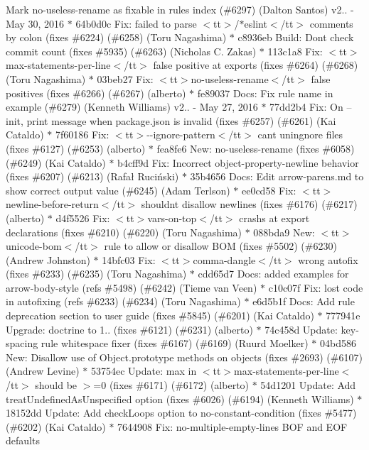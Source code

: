 \begin{DoxyItemize}
Mark no-\/useless-\/rename as fixable in rules index (\#6297) (\+Dalton Santos)  v2.. -\/ May 30, 2016  \texorpdfstring{$\ast$}{*} 64b0d0c Fix\+: failed to parse $<$tt$>$/\texorpdfstring{$\ast$}{*}eslint$<$/tt$>$ comments by colon (fixes \#6224) (\#6258) (\+Toru Nagashima) \texorpdfstring{$\ast$}{*} c8936eb Build\+: Don\textquotesingle{}t check commit count (fixes \#5935) (\#6263) (\+Nicholas C. Zakas) \texorpdfstring{$\ast$}{*} 113c1a8 Fix\+: $<$tt$>$max-\/statements-\/per-\/line$<$/tt$>$ false positive at exports (fixes \#6264) (\#6268) (\+Toru Nagashima) \texorpdfstring{$\ast$}{*} 03beb27 Fix\+: $<$tt$>$no-\/useless-\/rename$<$/tt$>$ false positives (fixes \#6266) (\#6267) (alberto) \texorpdfstring{$\ast$}{*} fe89037 Docs\+: Fix rule name in example (\#6279) (\+Kenneth Williams)  v2.. -\/ May 27, 2016  \texorpdfstring{$\ast$}{*} 77dd2b4 Fix\+: On --init, print message when package.\+json is invalid (fixes \#6257) (\#6261) (\+Kai Cataldo) \texorpdfstring{$\ast$}{*} 7f60186 Fix\+: $<$tt$>$-\/-\/ignore-\/pattern$<$/tt$>$ can\textquotesingle{}t uningnore files (fixes \#6127) (\#6253) (alberto) \texorpdfstring{$\ast$}{*} fea8fe6 New\+: no-\/useless-\/rename (fixes \#6058) (\#6249) (\+Kai Cataldo) \texorpdfstring{$\ast$}{*} b4cff9d Fix\+: Incorrect object-\/property-\/newline behavior (fixes \#6207) (\#6213) (\+Rafał Ruciński) \texorpdfstring{$\ast$}{*} 35b4656 Docs\+: Edit arrow-\/parens.\+md to show correct output value (\#6245) (\+Adam Terlson) \texorpdfstring{$\ast$}{*} ee0cd58 Fix\+: $<$tt$>$newline-\/before-\/return$<$/tt$>$ shouldn\textquotesingle{}t disallow newlines (fixes \#6176) (\#6217) (alberto) \texorpdfstring{$\ast$}{*} d4f5526 Fix\+: $<$tt$>$vars-\/on-\/top$<$/tt$>$ crashs at export declarations (fixes \#6210) (\#6220) (\+Toru Nagashima) \texorpdfstring{$\ast$}{*} 088bda9 New\+: $<$tt$>$unicode-\/bom$<$/tt$>$ rule to allow or disallow BOM (fixes \#5502) (\#6230) (\+Andrew Johnston) \texorpdfstring{$\ast$}{*} 14bfc03 Fix\+: $<$tt$>$comma-\/dangle$<$/tt$>$ wrong autofix (fixes \#6233) (\#6235) (\+Toru Nagashima) \texorpdfstring{$\ast$}{*} cdd65d7 Docs\+: added examples for arrow-\/body-\/style (refs \#5498) (\#6242) (\+Tieme van Veen) \texorpdfstring{$\ast$}{*} c10c07f Fix\+: lost code in autofixing (refs \#6233) (\#6234) (\+Toru Nagashima) \texorpdfstring{$\ast$}{*} e6d5b1f Docs\+: Add rule deprecation section to user guide (fixes \#5845) (\#6201) (\+Kai Cataldo) \texorpdfstring{$\ast$}{*} 777941e Upgrade\+: doctrine to 1.. (fixes \#6121) (\#6231) (alberto) \texorpdfstring{$\ast$}{*} 74c458d Update\+: key-\/spacing rule whitespace fixer (fixes \#6167) (\#6169) (\+Ruurd Moelker) \texorpdfstring{$\ast$}{*} 04bd586 New\+: Disallow use of Object.\+prototype methods on objects (fixes \#2693) (\#6107) (\+Andrew Levine) \texorpdfstring{$\ast$}{*} 53754ec Update\+: max in $<$tt$>$max-\/statements-\/per-\/line$<$/tt$>$ should be $>$=0 (fixes \#6171) (\#6172) (alberto) \texorpdfstring{$\ast$}{*} 54d1201 Update\+: Add treat\+Undefined\+As\+Unspecified option (fixes \#6026) (\#6194) (\+Kenneth Williams) \texorpdfstring{$\ast$}{*} 18152dd Update\+: Add check\+Loops option to no-\/constant-\/condition (fixes \#5477) (\#6202) (\+Kai Cataldo) \texorpdfstring{$\ast$}{*} 7644908 Fix\+: no-\/multiple-\/empty-\/lines BOF and EOF defaults 
\end{DoxyItemize}
